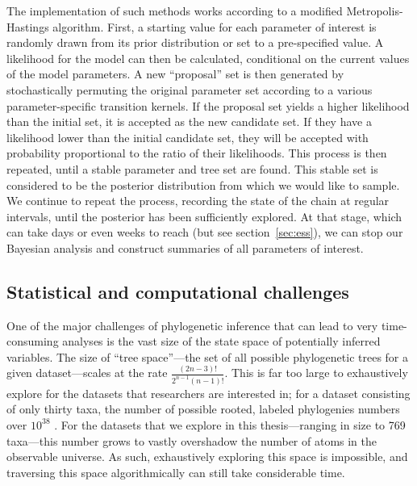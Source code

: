 The implementation of such methods works according to a modified Metropolis-Hastings algorithm.
First, a starting value for each parameter of interest is randomly drawn from its prior distribution or set to a pre-specified value.
A likelihood for the model can then be calculated, conditional on the current values of the model parameters.
A new ``proposal'' set is then generated by stochastically permuting the original parameter set according to a various parameter-specific transition kernels.
If the proposal set yields a higher likelihood than the initial set, it is accepted as the new candidate set.
If they have a likelihood lower than the initial candidate set, they will be accepted with probability proportional to the ratio of their likelihoods.
This process is then repeated, until a stable parameter and tree set are found.
This stable set is considered to be the posterior distribution from which we would like to sample.
We continue to repeat the process, recording the state of the chain at regular intervals, until the posterior has been sufficiently explored.
At that stage, which can take days or even weeks to reach (but see section~\ref{sec:ess}), we can stop our Bayesian analysis and construct summaries of all parameters of interest.

\subsection{Statistical and computational challenges}

One of the major challenges of phylogenetic inference that can lead to very time-consuming analyses is the vast size of the state space of potentially inferred variables.
The size of ``tree space''---the set of all possible phylogenetic trees for a given dataset---scales at the rate $\frac{(2n-3)!}{2^{n-1}(n-1)!}$.
This is far too large to exhaustively explore for the datasets that researchers are interested in; for a dataset consisting of only thirty taxa, the number of possible rooted, labeled phylogenies numbers over $10^{38}$ \cite{felsenstein2003inferring}.
For the datasets that we explore in this thesis---ranging in size to 769 taxa---this number grows to vastly overshadow the number of atoms in the observable universe.
As such, exhaustively exploring this space is impossible, and traversing this space algorithmically can still take considerable time.

